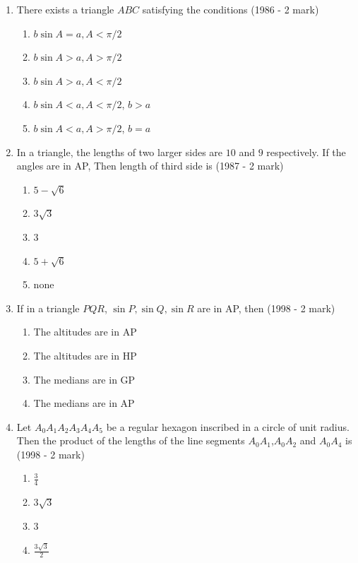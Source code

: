 \begin{enumerate}[label=\thesubsection.\arabic*,ref=\thesubsection.\theenumi]
    \item There exists a triangle $ABC$ satisfying the conditions
    \hfill{(1986 - 2 mark)}
    \begin{enumerate}
    	\item $b\sin{A} = a, A <\pi/2$
    	\item $b\sin{A} > a, A >\pi/2$
    	\item $b\sin{A} > a, A <\pi/2$
    	\item $b\sin{A} < a, A <\pi/2$, $b > a$
    	\item $b\sin{A} < a, A >\pi/2$, $b = a$
    \end{enumerate}
    \item In a triangle, the lengths of two larger sides are $10$ and $9$ respectively. If the angles are in AP, Then length of third side is
    \hfill{(1987 - 2 mark)}
    \begin{multicols}{2}
    	\begin{enumerate}
    		\item $5-\sqrt{6}$ 
    		\item $3\sqrt{3}$
    		\item $3$
    		\item $5+\sqrt{6}$ 
    		\item none
    	\end{enumerate}
    \end{multicols}
    \item If in a triangle $PQR$, $\sin{P}, \sin{Q}, \sin{R}$ are in AP, then
    \hfill{(1998 - 2 mark)}
    \begin{enumerate}
    	\item The altitudes are in AP
    	\item The altitudes are in HP
    	\item The medians are in GP
    	\item The medians are in AP
    \end{enumerate}
    \item Let $A_{0}A_{1}A_{2}A_{3}A_{4}A_{5}$ be a regular hexagon inscribed in a circle of unit radius. Then the product of the lengths of the line segments $A_{0}A_{1}$,$A_{0}A_{2}$ and $A_{0}A_{4}$ is 
    \hfill{(1998 - 2 mark)}
    \begin{multicols}{2}
    	\begin{enumerate}
    		\item ${\frac{3}{4}}$
    		\item $3\sqrt{3}$
    		\item $3$
    		\item ${\frac{3\sqrt{3}}{2}}$

\end{enumerate}
\end{multicols}
\end{enumerate}
